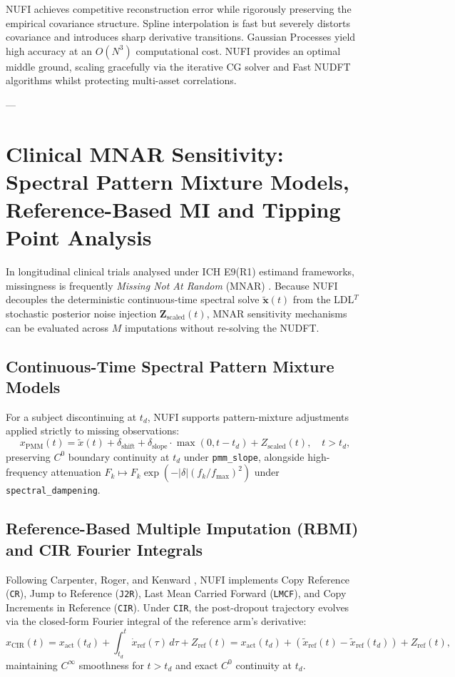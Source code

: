 \documentclass[11pt,a4paper]{article}
\begin{document}
NUFI achieves competitive reconstruction error while rigorously preserving the empirical covariance structure. Spline interpolation is fast but severely distorts covariance and introduces sharp derivative transitions. Gaussian Processes yield high accuracy at an $O(N^3)$ computational cost. NUFI provides an optimal middle ground, scaling gracefully via the iterative CG solver and Fast NUDFT algorithms whilst protecting multi-asset correlations.

---

\section{Clinical MNAR Sensitivity: Spectral Pattern Mixture Models, Reference-Based MI and Tipping Point Analysis}
\label{sec:mnar}

In longitudinal clinical trials analysed under ICH E9(R1) estimand frameworks, missingness is frequently \emph{Missing Not At Random} (MNAR) \cite{Diggle1994}. Because NUFI decouples the deterministic continuous-time spectral solve $\tilde{\mathbf{x}}(t)$ from the LDL$^T$ stochastic posterior noise injection $\mathbf{Z}_{\text{scaled}}(t)$, MNAR sensitivity mechanisms can be evaluated across $M$ imputations without re-solving the NUDFT.

\subsection{Continuous-Time Spectral Pattern Mixture Models}
For a subject discontinuing at $t_d$, NUFI supports pattern-mixture adjustments applied strictly to missing observations:
\begin{equation}
x_{\text{PMM}}(t) = \tilde{x}(t) + \delta_{\text{shift}} + \delta_{\text{slope}} \cdot \max(0, t - t_d) + Z_{\text{scaled}}(t), \quad t > t_d,
\end{equation}
preserving $C^0$ boundary continuity at $t_d$ under \texttt{pmm\_slope}, alongside high-frequency attenuation $F_k \mapsto F_k \exp(-|\delta|(f_k/f_{\max})^2)$ under \texttt{spectral\_dampening}.

\subsection{Reference-Based Multiple Imputation (RBMI) and CIR Fourier Integrals}
Following Carpenter, Roger, and Kenward \cite{Carpenter2013}, NUFI implements Copy Reference (\texttt{CR}), Jump to Reference (\texttt{J2R}), Last Mean Carried Forward (\texttt{LMCF}), and Copy Increments in Reference (\texttt{CIR}). Under \texttt{CIR}, the post-dropout trajectory evolves via the closed-form Fourier integral of the reference arm's derivative:
\begin{equation}
x_{\text{CIR}}(t) = x_{\text{act}}(t_d) + \int_{t_d}^{t} \dot{x}_{\text{ref}}(\tau)\,d\tau + Z_{\text{ref}}(t) = x_{\text{act}}(t_d) + \left(\tilde{x}_{\text{ref}}(t) - \tilde{x}_{\text{ref}}(t_d)\right) + Z_{\text{ref}}(t),
\end{equation}
maintaining $C^\infty$ smoothness for $t > t_d$ and exact $C^0$ continuity at $t_d$.
\end{document}
